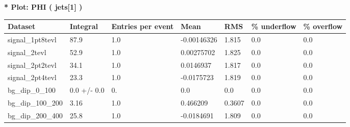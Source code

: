 \documentclass[a4paper, 10pt]{article}
\begin{document}
\textbf{* Plot: PHI ( jets[1] ) }\\
   \begin{table}[H]
  \begin{center}
    \begin{tabular}{|m{23.0mm}|m{23.0mm}|m{18.0mm}|m{19.0mm}|m{19.0mm}|m{19.0mm}|m{19.0mm}|}
      \hline
      {\cellcolor{yellow}         Dataset}& {\cellcolor{yellow}         Integral}& {\cellcolor{yellow}         Entries per event}& {\cellcolor{yellow}         Mean}& {\cellcolor{yellow}         RMS}& {\cellcolor{yellow}         \% underflow}& {\cellcolor{yellow}         \% overflow}\\
      \hline
      {\cellcolor{white}         signal\_1pt8tevl}& {\cellcolor{white}         87.9}& {\cellcolor{white}         1.0}& {\cellcolor{white}         -0.00146326}& {\cellcolor{white}         1.815}& {\cellcolor{green}         0.0}& {\cellcolor{green}         0.0}\\
      \hline
      {\cellcolor{white}         signal\_2tevl}& {\cellcolor{white}         52.9}& {\cellcolor{white}         1.0}& {\cellcolor{white}         0.00275702}& {\cellcolor{white}         1.825}& {\cellcolor{green}         0.0}& {\cellcolor{green}         0.0}\\
      \hline
      {\cellcolor{white}         signal\_2pt2tevl}& {\cellcolor{white}         34.1}& {\cellcolor{white}         1.0}& {\cellcolor{white}         0.0146937}& {\cellcolor{white}         1.817}& {\cellcolor{green}         0.0}& {\cellcolor{green}         0.0}\\
      \hline
      {\cellcolor{white}         signal\_2pt4tevl}& {\cellcolor{white}         23.3}& {\cellcolor{white}         1.0}& {\cellcolor{white}         -0.0175723}& {\cellcolor{white}         1.819}& {\cellcolor{green}         0.0}& {\cellcolor{green}         0.0}\\
      \hline
      {\cellcolor{white}         bg\_dip\_0\_100}& {\cellcolor{white}         0.0 +/\-- 0.0}& {\cellcolor{white}         0.}& {\cellcolor{white}         0.0}& {\cellcolor{white}         0.0}& {\cellcolor{green}         0.0}& {\cellcolor{green}         0.0}\\
      \hline
      {\cellcolor{white}         bg\_dip\_100\_200}& {\cellcolor{white}         3.16}& {\cellcolor{white}         1.0}& {\cellcolor{white}         0.466209}& {\cellcolor{white}         0.3607}& {\cellcolor{green}         0.0}& {\cellcolor{green}         0.0}\\
      \hline
      {\cellcolor{white}         bg\_dip\_200\_400}& {\cellcolor{white}         25.8}& {\cellcolor{white}         1.0}& {\cellcolor{white}         -0.0184691}& {\cellcolor{white}         1.809}& {\cellcolor{green}         0.0}& {\cellcolor{green}         0.0}\\

\end{tabular}
\end{center}
\end{table}
\end{document}
